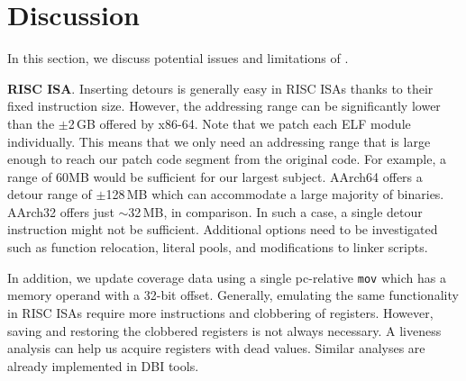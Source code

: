 
\section{Discussion}
\label{sec:discussion}
In this section, we discuss potential issues and limitations of {\bcov}.

\textbf{RISC ISA}.
Inserting detours is generally easy in RISC ISAs thanks to their fixed instruction size.
However, the addressing range can be significantly lower than the $\pm$2\,GB offered by x86-64.
Note that we patch each ELF module individually.
This means that we only need an addressing range that is large enough to reach our patch code segment from the original code.
For example, a range of 60MB would be sufficient for our largest subject.
AArch64 offers a detour range of $\pm$128\,MB  which can accommodate a large majority of binaries.
AArch32 offers just $\sim$32\,MB, in comparison.
In such a case, a single detour instruction might not be sufficient.
Additional options need to be investigated such as function relocation, literal pools, and modifications to linker scripts.

In addition, we update coverage data using a single pc-relative \texttt{mov} which has a memory operand with a 32-bit offset.
Generally, emulating the same functionality in RISC ISAs require more instructions and clobbering of registers.
However, saving and restoring the clobbered registers is not always necessary.
A liveness analysis can help us acquire registers with dead values. 
Similar analyses are already implemented in DBI tools.


